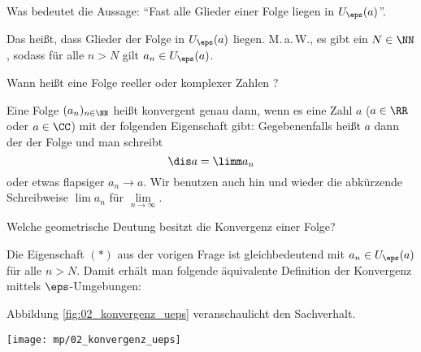 \begin{frage}%
  \label{02_fa}
  Was bedeutet die Aussage: 
  "`Fast alle Glieder einer Folge liegen in $U_\eps(a)$"'.
\end{frage}

\begin{antwort}
  Das heißt, dass  Glieder der 
  Folge in $U_\eps(a)$ liegen. M.\,a.\,W., es gibt ein $N\in\NN$, sodass 
  für alle $n>N$ gilt $a_n\in U_\eps(a)$.
  \AntEnd
\end{antwort}



\begin{frage}%
  Wann heißt eine Folge reeller oder komplexer Zahlen ?
\end{frage}

\begin{antwort}
  Eine Folge $(a_n)_{n\in\NN}$ heißt konvergent genau dann, 
  wenn es eine Zahl $a$ 
  ($a\in \RR$ oder $a\in\CC$) mit der folgenden Eigenschaft gibt: 
  Gegebenenfalls heißt $a$ dann der  der Folge und man 
  schreibt
  \[
  \dis a=\limm a_n 
  \]
  oder etwas flapsiger $a_n\to a$. Wir benutzen auch hin und wieder die 
  abkürzende Schreibweise $\lim a_n$ für $\lim\limits_{n\to\infty}$. 
  \AntEnd
\end{antwort}



\begin{frage}%
  \label{02_fgeo}
  Welche geometrische Deutung besitzt die Konvergenz einer Folge?
\end{frage}

\begin{antwort}
  Die Eigenschaft $(\ast)$ aus der vorigen Frage ist gleichbedeutend 
  mit $a_n\in U_\eps(a)$ für alle $n>N$. Damit erhält man folgende 
  äquivalente Definition der Konvergenz mittels $\eps$-Umgebungen: 

  \medskip

  \medskip
  Abbildung \ref{fig:02_konvergenz_ueps} veranschaulicht den Sachverhalt. 
  \AntEnd
  
  \begin{center}
    \texttt{[image: mp/02\_konvergenz\_ueps]}
    \label{fig:02_konvergenz_ueps}
  \end{center}
\end{antwort}


